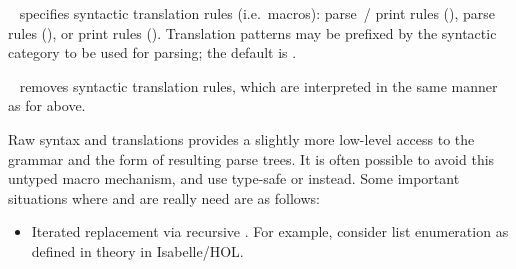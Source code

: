 \begin{isabellebody}
\begin{isamarkuptext}
\begin{description}
  \item \hyperlink{command.translations}{\mbox{}}~ specifies syntactic
  translation rules (i.e.\ macros): parse~/ print rules (),
  parse rules (), or print rules ().
  Translation patterns may be prefixed by the syntactic category to be
  used for parsing; the default is .

  \item \hyperlink{command.no-translations}{\mbox{}}~ removes syntactic
  translation rules, which are interpreted in the same manner as for
  \hyperlink{command.translations}{\mbox{}} above.

  \end{description}

  Raw syntax and translations provides a slightly more low-level
  access to the grammar and the form of resulting parse trees.  It is
  often possible to avoid this untyped macro mechanism, and use
  type-safe \hyperlink{command.abbreviation}{\mbox{}} or \hyperlink{command.notation}{\mbox{}} instead.
  Some important situations where \hyperlink{command.syntax}{\mbox{}} and \hyperlink{command.translations}{\mbox{}} are really need are as follows:

  \begin{itemize}

  \item Iterated replacement via recursive \hyperlink{command.translations}{\mbox{}}.
  For example, consider list enumeration  as
  defined in theory \hyperlink{theory.List}{\mbox{}} in Isabelle/HOL.


\end{itemize}
\end{isamarkuptext}
\end{isabellebody}
